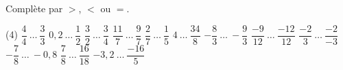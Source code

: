 %
%
Complète par $>$, $<$ ou $=$.
  \begin{tasks}(4)
    \task $\dfrac{4}{4}~\ldots~\dfrac{3}{3}$
    \task $0,2~\ldots~\dfrac{1}{2}$
    \task $\dfrac{3}{2}~\ldots~\dfrac{3}{4}$
    \task $\dfrac{11}{7}~\ldots~\dfrac{9}{7}$
    \task $\dfrac{2}{7}~\ldots~\dfrac{1}{5}$
    \task $4~\ldots~\dfrac{34}{8}$
    \task $- \dfrac{8}{3}~\ldots~ - \dfrac{9}{3}$
    \task $\dfrac{- 9}{12}~\ldots~\dfrac{- 12}{12}$
    \task $\dfrac{- 2}{3}~\ldots~\dfrac{- 2}{- 3}$
    \task $- \dfrac{7}{8}~\ldots~ - 0,8$
    \task $\dfrac{7}{8}~\ldots~\dfrac{16}{18}$
    \task $- 3,2~\ldots~\dfrac{- 16}{5}$
  \end{tasks}
